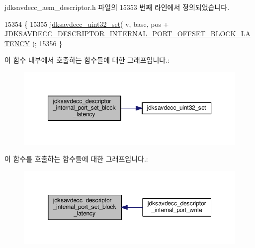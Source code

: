 jdksavdecc\+\_\+aem\+\_\+descriptor.\+h 파일의 15353 번째 라인에서 정의되었습니다.


\begin{DoxyCode}
15354 \{
15355     \hyperlink{group__endian_ga59b24ae6f7f47ca4d24ea337543162bf}{jdksavdecc\_uint32\_set}( v, base, pos + 
      \hyperlink{group__descriptor__internal__port_ga6ae94a3ccca7c69be0eeade4b174485b}{JDKSAVDECC\_DESCRIPTOR\_INTERNAL\_PORT\_OFFSET\_BLOCK\_LATENCY}
       );
15356 \}
\end{DoxyCode}


이 함수 내부에서 호출하는 함수들에 대한 그래프입니다.\+:
\nopagebreak
\begin{figure}[H]
\begin{center}
\leavevmode
\includegraphics[width=350pt]{group__descriptor__internal__port_ga249a80a69ae2c9f45b3aa31b9d823ded_cgraph}
\end{center}
\end{figure}




이 함수를 호출하는 함수들에 대한 그래프입니다.\+:
\nopagebreak
\begin{figure}[H]
\begin{center}
\leavevmode
\includegraphics[width=350pt]{group__descriptor__internal__port_ga249a80a69ae2c9f45b3aa31b9d823ded_icgraph}
\end{center}
\end{figure}


